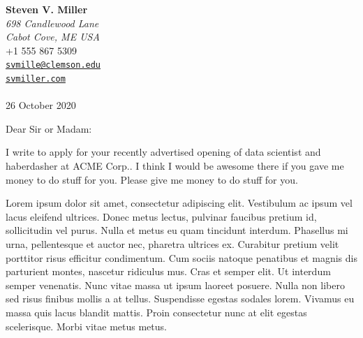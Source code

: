 \documentclass[
  11pt,
]{article}
\author{Steven V. Miller}
\date{26 October 2020}
\date{}
\begin{document}
\hfill
\begin{minipage}[t]{1\textwidth}
\raggedleft%
{\bfseries Steven V. Miller }\\[.35ex]
\emph{\small 698 Candlewood Lane\\
Cabot Cove, ME USA} \\[.35ex]
\faPhone \hspace{1 mm} \small{+1 555 867 5309} \\ 
\faEnvelopeO \hspace{1 mm} \small{\tt \href{mailto:svmille@clemson.edu}{\nolinkurl{svmille@clemson.edu}}} \\ 
\faGlobe \hspace{1 mm} \small{\href{http://svmiller.com}{\tt svmiller.com}}\\ 
\hspace{1cm} \\
 26 October 2020 \\ 
\end{minipage}


\vspace*{1em}

Dear Sir or Madam:

\vspace*{1em}


% 
% 

% 
I write to apply for your recently advertised opening of data scientist
and haberdasher at ACME Corp.. I think I would be awesome there if you
gave me money to do stuff for you. Please give me money to do stuff for
you.

Lorem ipsum dolor sit amet, consectetur adipiscing elit. Vestibulum ac
ipsum vel lacus eleifend ultrices. Donec metus lectus, pulvinar faucibus
pretium id, sollicitudin vel purus. Nulla et metus eu quam tincidunt
interdum. Phasellus mi urna, pellentesque et auctor nec, pharetra
ultrices ex. Curabitur pretium velit porttitor risus efficitur
condimentum. Cum sociis natoque penatibus et magnis dis parturient
montes, nascetur ridiculus mus. Cras et semper elit. Ut interdum semper
venenatis. Nunc vitae massa ut ipsum laoreet posuere. Nulla non libero
sed risus finibus mollis a at tellus. Suspendisse egestas sodales lorem.
Vivamus eu massa quis lacus blandit mattis. Proin consectetur nunc at
elit egestas scelerisque. Morbi vitae metus metus.
\end{document}
